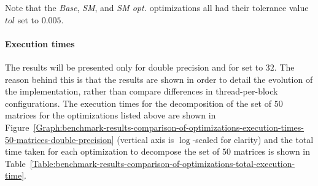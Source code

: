 Note that the \textit{Base}, \textit{SM}, and \textit{SM opt.} optimizations all had their tolerance value $ tol $ set to $ 0.005 $.

\paragraph{Execution times} The results will be presented only for double precision and for  set to $ 32 $. The reason behind this is that the results are shown in order to detail the evolution of the implementation, rather than compare differences in thread-per-block configurations. The execution times for the decomposition of the set of $ 50 $ matrices for the optimizations listed above are shown in Figure~\ref{Graph:benchmark-results-comparison-of-optimizations-execution-times-50-matrices-double-precision} (vertical axis is $ \log $-scaled for clarity) and the total time taken for each optimization to decompose the set of $ 50 $ matrices is shown in Table~\ref{Table:benchmark-results-comparison-of-optimizations-total-execution-time}.

